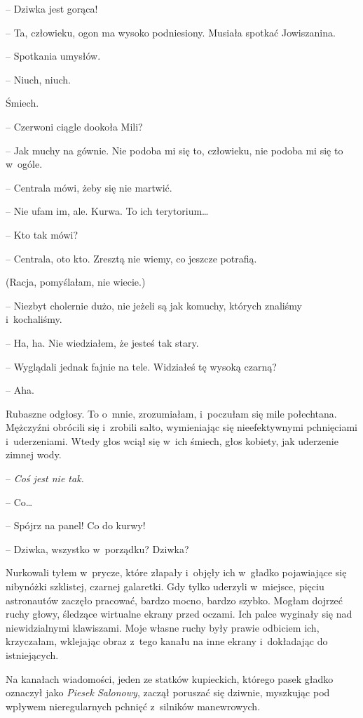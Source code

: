 \documentclass[oneside,polish,11pt,sfheadings]{mwbk}
\begin{document}
-- Dziwka jest gorąca!

-- Ta, człowieku, ogon ma wysoko podniesiony. Musiała spotkać
Jowiszanina.

-- Spotkania umysłów.

-- Niuch, niuch.

Śmiech.

-- Czerwoni ciągle dookoła Mili?

-- Jak muchy na gównie. Nie podoba mi się to, człowieku, nie podoba mi
się to w~ogóle.

-- Centrala mówi, żeby się nie martwić.

-- Nie ufam im, ale. Kurwa. To ich terytorium\ldots 

-- Kto tak mówi?

-- Centrala, oto kto. Zresztą nie wiemy, co jeszcze potrafią.

(Racja, pomyślałam, nie wiecie.)

-- Niezbyt cholernie dużo, nie jeżeli są jak komuchy, których znaliśmy i~kochaliśmy.

-- Ha, ha. Nie wiedziałem, że jesteś tak stary.

-- Wyglądali jednak fajnie na tele. Widziałeś tę wysoką czarną?

-- Aha.

Rubaszne odgłosy. To o~mnie, zrozumiałam, i~poczułam się mile
połechtana. Mężczyźni obrócili się i~zrobili salto, wymieniając się
nieefektywnymi pchnięciami i~uderzeniami. Wtedy głos wciął się w~ich
śmiech, głos kobiety, jak uderzenie zimnej wody.

-- \textit{Coś jest nie tak.}

-- Co\ldots 

-- Spójrz na panel! Co do kurwy!

-- Dziwka, wszystko w~porządku? Dziwka?

Nurkowali tyłem w~prycze, które złapały i~objęły ich w~gładko
pojawiające się nibynóżki szklistej, czarnej galaretki. Gdy tylko
uderzyli w~miejsce, pięciu astronautów zaczęło pracować, bardzo mocno,
bardzo szybko. Mogłam dojrzeć ruchy głowy, śledzące wirtualne ekrany
przed oczami. Ich palce wyginały się nad niewidzialnymi klawiszami. Moje
własne ruchy były prawie odbiciem ich, krzyczałam, wklejając obraz z~tego kanału na inne ekrany i~dokładając do istniejących.

Na kanałach wiadomości, jeden ze statków kupieckich, którego pasek
gładko oznaczył jako \textit{Piesek Salonowy}, zaczął poruszać się
dziwnie, myszkując pod wpływem nieregularnych pchnięć z~silników
manewrowych.
\end{document}
